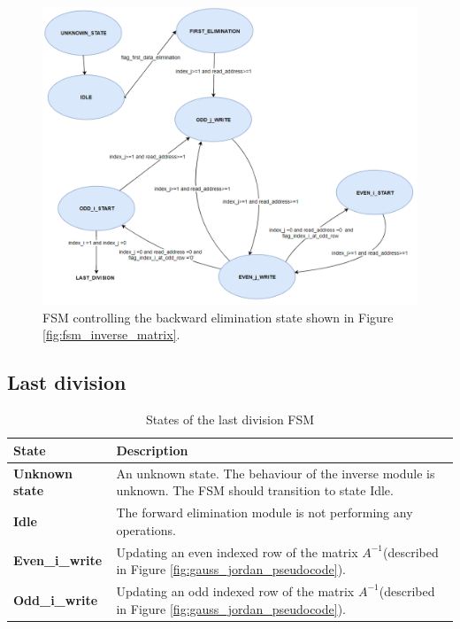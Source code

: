 \begin{figure}[H]
\centering
   \includegraphics[scale=0.5]{images/inverse_hw/fsm_backward_elimination.PNG}
  \caption{FSM controlling the backward elimination state shown in Figure \ref{fig:fsm_inverse_matrix}.  } 
  \label{fig:fsm_backward_elimination}
\end{figure}

\subsection{Last division}

\begin{table}[H]
\centering
 \resizebox{1\textwidth}{!}
{\begin{tabular}{l|l}
State                                                                                    & Description                                                                                   \\
\hline
\textbf{Unknown state}                                                                   & An unknown state. The behaviour of the inverse module is unknown. The FSM should transition to state Idle.                                    \\
\textbf{Idle}                                                                            & The forward elimination module is not performing any operations.                                          \\


\textbf{Even\_i\_write}                                                           & Updating an even indexed row of the matrix $A^{-1}$(described in Figure \ref{fig:gauss_jordan_pseudocode}).       \\
\textbf{Odd\_i\_write}                                                                  & Updating an odd indexed row of the matrix $A^{-1}$(described in Figure \ref{fig:gauss_jordan_pseudocode}).   
\end{tabular}}
\caption{States of the last division FSM}
\label{tab:fsm_last_division}

\end{table}


